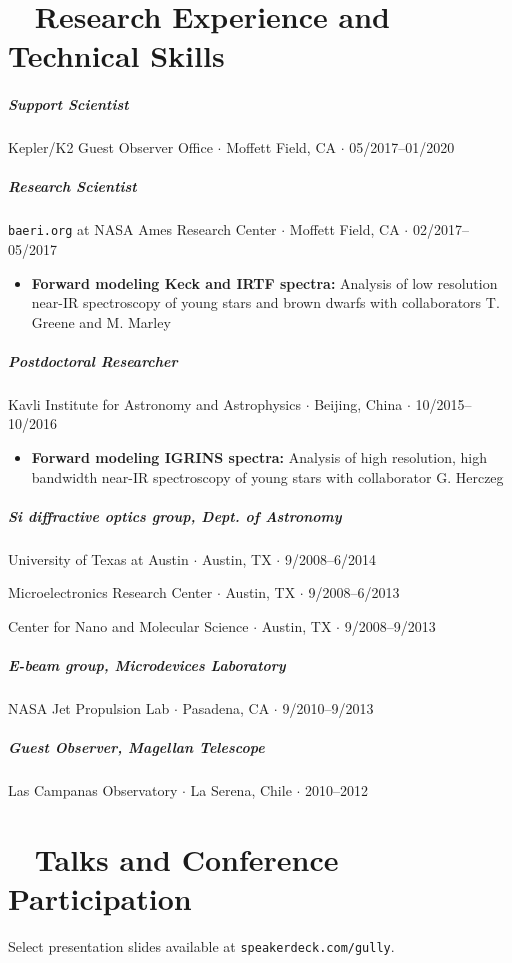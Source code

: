 \documentclass[10pt,letterpaper]{article}
\begin{document}
\section*{\faWrench ~ Research Experience and Technical Skills}

\subparagraph{Support Scientist}
Kepler/K2 Guest Observer Office $\cdot$ Moffett Field, CA $\cdot$ 05/2017--01/2020

\subparagraph{Research Scientist}
\texttt{baeri.org} at NASA Ames Research Center $\cdot$ Moffett Field, CA $\cdot$ 02/2017--05/2017
\begin{itemize}
    \item  \textbf{Forward modeling Keck and IRTF spectra:} Analysis of low resolution near-IR spectroscopy of young stars and brown dwarfs with collaborators T. Greene and M. Marley
\end{itemize}

\subparagraph{Postdoctoral Researcher}
Kavli Institute for Astronomy and Astrophysics $\cdot$ Beijing, China $\cdot$ 10/2015--10/2016
\begin{itemize}
    \item  \textbf{Forward modeling IGRINS spectra:} Analysis of high resolution, high bandwidth near-IR spectroscopy of young stars with collaborator G. Herczeg
\end{itemize}

\subparagraph{Si diffractive optics group, Dept. of Astronomy}
University of Texas at Austin $\cdot$ Austin, TX $\cdot$ 9/2008--6/2014
\begin{flushright}
Microelectronics Research Center $\cdot$ Austin, TX $\cdot$ 9/2008--6/2013

Center for Nano and Molecular Science $\cdot$ Austin, TX $\cdot$ 9/2008--9/2013
\end{flushright}


\subparagraph{E-beam group, Microdevices Laboratory}
NASA Jet Propulsion Lab $\cdot$ Pasadena, CA $\cdot$ 9/2010--9/2013

\subparagraph{Guest Observer, Magellan Telescope}
Las Campanas Observatory $\cdot$ La Serena, Chile $\cdot$ 2010--2012


\section*{\faSlideshare ~ Talks and Conference Participation}

Select presentation slides available at \texttt{speakerdeck.com/gully}.
\end{document}
